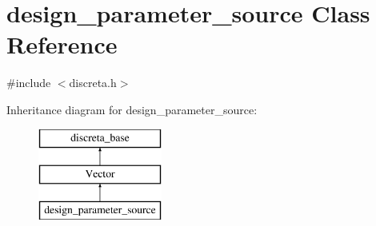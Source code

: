 \hypertarget{classdesign__parameter__source}{}\section{design\+\_\+parameter\+\_\+source Class Reference}
\label{classdesign__parameter__source}


{\ttfamily \#include $<$discreta.\+h$>$}

Inheritance diagram for design\+\_\+parameter\+\_\+source\+:\begin{figure}[H]
\begin{center}
\leavevmode
\includegraphics[height=3.000000cm]{classdesign__parameter__source}
\end{center}
\end{figure}
